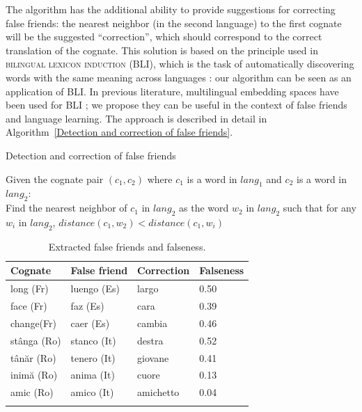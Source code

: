 \documentclass[output=paper]{langsci/langscibook}
\begin{document}
The algorithm has the additional ability to provide suggestions for correcting false friends: the nearest neighbor (in the second language) to the first cognate will be the suggested ``correction'', which should correspond to the correct translation of the cognate. This solution is based on the principle used in \textsc{bilingual lexicon induction} (BLI), which is the task of automatically discovering words with the same meaning across languages \citep{cognatesuban:mikolov2013exploiting,cognatesuban:heyman2017bilingual}: our algorithm can be seen as an application of BLI. In previous literature, multilingual embedding spaces have been used for BLI \citep{cognatesuban:vulic-moens-2015-bilingual}; we propose they can be useful in the context of false friends and language learning. The approach is described in detail in Algorithm~\ref{Detection and correction of false friends}.


\begin{algorithm}
\caption{Detection and correction of false friends}
\label{Detection and correction of false friends}
\SetAlgoLined
Given the cognate pair $(c_1, c_2)$ where $c_1$ is a word in $lang_1$ and $c_2$ is a word in $lang_2$:\\
Find the nearest neighbor of $c_1$ in $lang_2$ as the word $w_2$ in $lang_2$ such that for any $w_i$ in $lang_2$, $distance(c_1, w_2) < distance(c_1, w_i)$\\

\end{algorithm}



  \begin{table}
\begin{tabular}{l l l l}
\lsptoprule
Cognate & False friend & Correction & Falseness \\\midrule
long (Fr) & luengo (Es) & largo & 0.50 \\
face (Fr) & faz (Es)  & cara & 0.39 \\
change(Fr)  & caer (Es) & cambia & 0.46 \\
\midrule
stânga (Ro) & stanco (It) & destra & 0.52 \\
tânăr (Ro) & tenero (It) & giovane & 0.41 \\
inimă (Ro) & anima (It) & cuore & 0.13 \\
amic (Ro) & amico (It) & amichetto & 0.04 \\
\lspbottomrule

\end{tabular}

\caption{\label{table:ff_examples2}Extracted false friends and falseness.}
\end{table}
\end{document}
